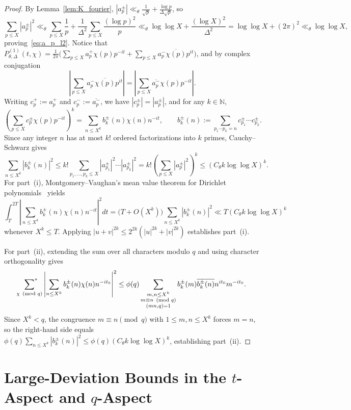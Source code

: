 \documentclass[11pt,a4paper]{amsart}
\theoremstyle{remark}
\numberwithin{equation}{section}
\newcommand{\N}{\mathbb{N}}
\begin{document}
\begin{proof}
By Lemma~\ref{lem:K_fourier}, $|a_p^\pm| \ll_\theta \frac{1}{\sqrt{p}} + \frac{\log p}{\Delta\sqrt{p}}$, so
\[
  \sum_{p\le X} |a_p^\pm|^2 \ll_\theta \sum_{p\le X}\frac{1}{p} + \frac{1}{\Delta^2}\sum_{p\le X}\frac{(\log p)^2}{p} \ll_\theta \log\log X + \frac{(\log X)^2}{\Delta^2} = \log\log X + (2\pi)^2 \ll_\theta \log\log X,
\]
proving~\eqref{eq:a_p_l2}. Notice that $P_{\theta,\Delta}^{(1)}(t,\chi) = \frac{1}{2\pi}\bigl(\sum_{p\le X} a_p^+ \chi(p)p^{-it} + \sum_{p\le X} a_p^- \overline{\chi(p)}p^{it}\bigr)$, and by complex conjugation
\[
  \left|\sum_{p\le X} a_p^- \overline{\chi(p)}p^{it}\right| = \left|\sum_{p\le X} \overline{a_p^-}\chi(p)p^{-it}\right|.
\]
Writing $c_p^+ := a_p^+$ and $c_p^- := \overline{a_p^-}$, we have $|c_p^\pm| = |a_p^\pm|$, and for any $k \in \N$,
\[
  \left(\sum_{p\le X} c_p^\pm \chi(p)p^{-it}\right)^k = \sum_{n\le X^k} b_k^\pm(n)\chi(n)n^{-it},
  \qquad b_k^\pm(n) := \sum_{p_1\cdots p_k = n} c_{p_1}^\pm \cdots c_{p_k}^\pm.
\]
Since any integer $n$ has at most $k!$ ordered factorizations into $k$ primes, Cauchy--Schwarz gives
\[
  \sum_{n\le X^k} |b_k^\pm(n)|^2 \le k!\sum_{p_1,\dots,p_k \le X} |a_{p_1}^\pm|^2\cdots |a_{p_k}^\pm|^2 = k!\left(\sum_{p\le X} |a_p^\pm|^2\right)^k \le (C_\theta k\log\log X)^k.
\]
For part~(i), Montgomery--Vaughan's mean value theorem for Dirichlet polynomials~\cite{MontgomeryVaughan1974} yields
\[
  \int_T^{2T} \left|\sum_{n\le X^k} b_k^\pm(n)\chi(n)n^{-it}\right|^2 dt = \bigl(T + O(X^k)\bigr)\sum_{n\le X^k} |b_k^\pm(n)|^2 \ll T(C_\theta k\log\log X)^k
\]
whenever $X^k \le T$. Applying $|u+v|^{2k} \le 2^{2k}(|u|^{2k}+|v|^{2k})$ establishes part~(i).

For part~(ii), extending the sum over all characters modulo $q$ and using character orthogonality gives
\[
  \sideset{}{^*}\sum_{\chi \pmod q}\left|\sum_{n\le X^k} b_k^\pm(n)\chi(n)n^{-it_0}\right|^2
  \le \phi(q)\sum_{\substack{m,n \le X^k \\ m \equiv n \pmod q \\ (mn,q)=1}} b_k^\pm(m)\overline{b_k^\pm(n)}n^{it_0}m^{-it_0}.
\]
Since $X^k < q$, the congruence $m \equiv n \pmod q$ with $1 \le m, n \le X^k$ forces $m = n$, so the right-hand side equals $\phi(q)\sum_{n\le X^k} |b_k^\pm(n)|^2 \le \phi(q)(C_\theta k\log\log X)^k$, establishing part~(ii).
\end{proof}

\section{Large-Deviation Bounds in the $t$-Aspect and $q$-Aspect}\label{sec:large_dev}
\end{document}
